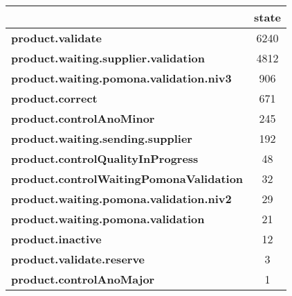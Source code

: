 \begin{tabular}{lc}
\toprule
{} &  state \\
\midrule
\textbf{product.validate                      } &   6240 \\
\textbf{product.waiting.supplier.validation   } &   4812 \\
\textbf{product.waiting.pomona.validation.niv3} &    906 \\
\textbf{product.correct                       } &    671 \\
\textbf{product.controlAnoMinor               } &    245 \\
\textbf{product.waiting.sending.supplier      } &    192 \\
\textbf{product.controlQualityInProgress      } &     48 \\
\textbf{product.controlWaitingPomonaValidation} &     32 \\
\textbf{product.waiting.pomona.validation.niv2} &     29 \\
\textbf{product.waiting.pomona.validation     } &     21 \\
\textbf{product.inactive                      } &     12 \\
\textbf{product.validate.reserve              } &      3 \\
\textbf{product.controlAnoMajor               } &      1 \\
\bottomrule
\end{tabular}
